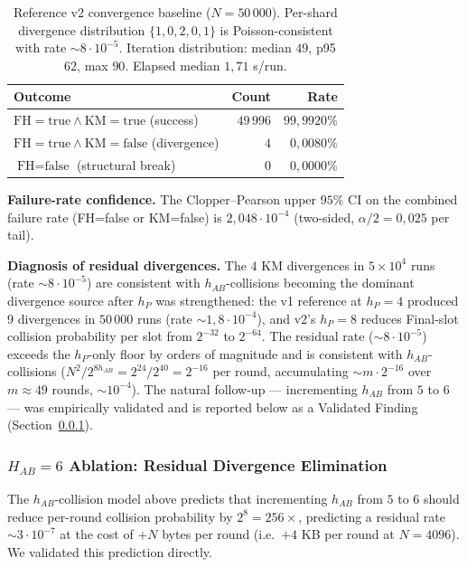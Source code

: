 \documentclass[11pt,a4paper]{article}
\begin{document}
\begin{table}[ht]
\centering
\small
\begin{tabular}{lrr}
\toprule
Outcome & Count & Rate \\
\midrule
$\text{FH}=\text{true} \land \text{KM}=\text{true}$ (success) & $49\,996$ & $99{,}9920\%$ \\
$\text{FH}=\text{true} \land \text{KM}=\text{false}$ (divergence) & $4$ & $0{,}0080\%$ \\
$\text{FH}=\text{false}$ (structural break) & $0$ & $0{,}0000\%$ \\
\bottomrule
\end{tabular}
\caption{Reference v2 convergence baseline ($N = 50\,000$). Per-shard divergence distribution $\{1, 0, 2, 0, 1\}$ is Poisson-consistent with rate $\sim 8 \cdot 10^{-5}$. Iteration distribution: median $49$, p95 $62$, max $90$. Elapsed median $1{,}71$ s/run.}
\label{tab:f2-v2}
\end{table}

\textbf{Failure-rate confidence.} The Clopper--Pearson upper $95\%$ CI on the combined failure rate (FH=false or KM=false) is $2{,}048 \cdot 10^{-4}$ (two-sided, $\alpha/2 = 0{,}025$ per tail).

\textbf{Diagnosis of residual divergences.} The $4$ KM divergences in $5 \times 10^4$ runs (rate $\sim 8 \cdot 10^{-5}$) are consistent with $h_{AB}$-collisions becoming the dominant divergence source after $h_P$ was strengthened: the v1 reference at $h_P = 4$ produced $9$ divergences in $50\,000$ runs (rate $\sim 1{,}8 \cdot 10^{-4}$), and v2's $h_P = 8$ reduces Final-slot collision probability per slot from $2^{-32}$ to $2^{-64}$. The residual rate ($\sim 8 \cdot 10^{-5}$) exceeds the $h_P$-only floor by orders of magnitude and is consistent with $h_{AB}$-collisions ($N^2 / 2^{8h_{AB}} = 2^{24}/2^{40} = 2^{-16}$ per round, accumulating $\sim m \cdot 2^{-16}$ over $m \approx 49$ rounds, $\sim 10^{-4}$). The natural follow-up — incrementing $h_{AB}$ from $5$ to $6$ — was empirically validated and is reported below as a Validated Finding (Section~\ref{sec:empirical-habresidual}).

\subsubsection{$H_{AB} = 6$ Ablation: Residual Divergence Elimination}\label{sec:empirical-habresidual}

The $h_{AB}$-collision model above predicts that incrementing $h_{AB}$ from $5$ to $6$ should reduce per-round collision probability by $2^8 = 256\times$, predicting a residual rate $\sim 3 \cdot 10^{-7}$ at the cost of $+N$ bytes per round (i.e.\ $+4$ KB per round at $N = 4096$). We validated this prediction directly.
\end{document}
